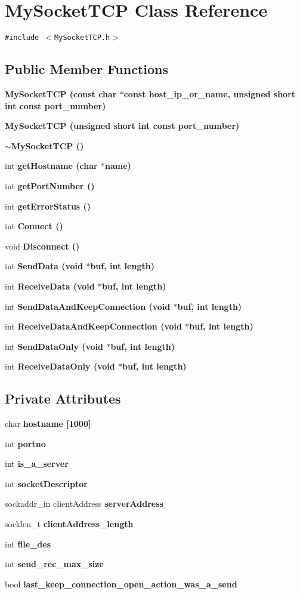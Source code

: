 \section{My\-Socket\-TCP Class Reference}
\label{classMySocketTCP}
{\tt \#include $<$My\-Socket\-TCP.h$>$}

\subsection*{Public Member Functions}
\begin{CompactItemize}
\item 
\bf{My\-Socket\-TCP} (const char $\ast$const host\_\-ip\_\-or\_\-name, unsigned short int const port\_\-number)
\item 
\bf{My\-Socket\-TCP} (unsigned short int const port\_\-number)
\item 
\bf{$\sim$My\-Socket\-TCP} ()
\item 
int \bf{get\-Hostname} (char $\ast$name)
\item 
int \bf{get\-Port\-Number} ()
\item 
int \bf{get\-Error\-Status} ()
\item 
int \bf{Connect} ()
\item 
void \bf{Disconnect} ()
\item 
int \bf{Send\-Data} (void $\ast$buf, int length)
\item 
int \bf{Receive\-Data} (void $\ast$buf, int length)
\item 
int \bf{Send\-Data\-And\-Keep\-Connection} (void $\ast$buf, int length)
\item 
int \bf{Receive\-Data\-And\-Keep\-Connection} (void $\ast$buf, int length)
\item 
int \bf{Send\-Data\-Only} (void $\ast$buf, int length)
\item 
int \bf{Receive\-Data\-Only} (void $\ast$buf, int length)
\end{CompactItemize}
\subsection*{Private Attributes}
\begin{CompactItemize}
\item 
char \bf{hostname} [1000]
\item 
int \bf{portno}
\item 
int \bf{is\_\-a\_\-server}
\item 
int \bf{socket\-Descriptor}
\item 
sockaddr\_\-in client\-Address \bf{server\-Address}
\item 
socklen\_\-t \bf{client\-Address\_\-length}
\item 
int \bf{file\_\-des}
\item 
int \bf{send\_\-rec\_\-max\_\-size}
\item 
bool \bf{last\_\-keep\_\-connection\_\-open\_\-action\_\-was\_\-a\_\-send}
\end{CompactItemize}


